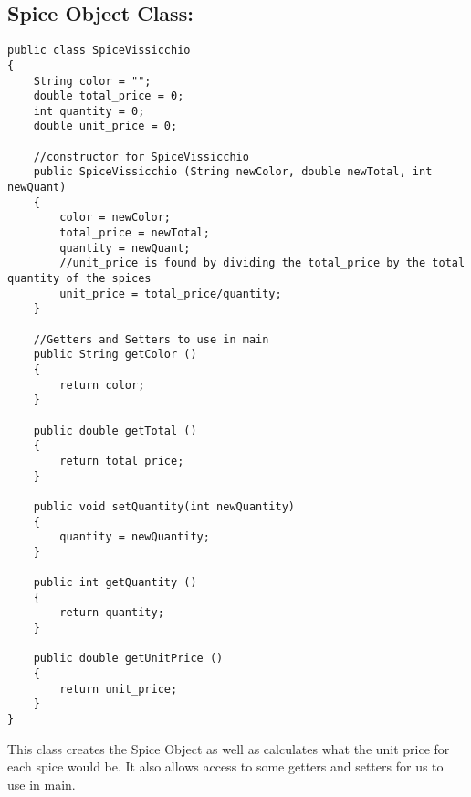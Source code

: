 \documentclass[letterpaper, 10pt]{article}
\begin{document}
\subsection{Spice Object Class:}
\begin{lstlisting}
public class SpiceVissicchio 
{
    String color = "";
    double total_price = 0;
    int quantity = 0;
    double unit_price = 0;
    
    //constructor for SpiceVissicchio
    public SpiceVissicchio (String newColor, double newTotal, int newQuant)
    {
        color = newColor;
        total_price = newTotal;
        quantity = newQuant;
        //unit_price is found by dividing the total_price by the total quantity of the spices
        unit_price = total_price/quantity;
    }

    //Getters and Setters to use in main
    public String getColor ()
    {
        return color;
    }

    public double getTotal ()
    {
        return total_price;
    }

    public void setQuantity(int newQuantity)
    {
        quantity = newQuantity;
    }

    public int getQuantity ()
    {
        return quantity;
    }

    public double getUnitPrice ()
    {
        return unit_price;
    }
}
\end{lstlisting}
This class creates the Spice Object as well as calculates what the unit price for\\
each spice would be. It also allows access to some getters and setters for us to\\ 
use in main.\\

\noindent
\end{document}

